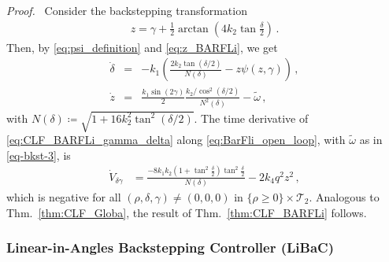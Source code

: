 \documentclass[journal,twoside,web]{ieeecolor}
\theoremstyle{definition}
\renewenvironment{proof}[1][Proof]{\par\pushQED{\qed}\normalfont\textit{#1.}~}{\popQED\par}
\begin{document}
\begin{proof}
Consider the backstepping transformation
\begin{align}\label{eq:z_BARFLi}
z =  \gamma + \frac{1}{2}\arctan\left(4k_2\tan\frac{\delta}{2}\right) 
\,.
\end{align} 
Then, by \eqref{eq:psi_definition} and \eqref{eq:z_BARFLi}, we get
\begin{subequations}
\label{eq:BarFli_open_loop}
\begin{eqnarray}
\dot{\delta} &=&  -k_1 \left( \frac{2k_2 \tan(\delta/2)}{N(\delta)} - z \psi(z,\gamma)\right)\,, \\
\dot{z} &=& \frac{k_1 \sin(2\gamma)}{2}\frac{k_2/\cos^2(\delta/2)}{N^2(\delta)} -\tilde{\omega} \,, \label{eq:zdot_BARFLi}
\end{eqnarray}
\end{subequations}
with $N(\delta) \coloneqq \sqrt{1 + 16 k_2^2 \tan^2(\delta/2)}$.
The time derivative of \eqref{eq:CLF_BARFLi_gamma_delta} along \eqref{eq:BarFli_open_loop}, with $\tilde{\omega}$ as in \eqref{eq-bkst-3}, is
\begin{align}\label{eq:V1_dot_cl_BARFLi}
\dot{V}_{\delta \gamma } &= \frac{-8k_1k_2(1 + \tan^2\frac{\delta}{2})\tan^2\frac{\delta}{2}}{N(\delta)} - 2k_4q^2z^2 
\,,
\end{align}
which is negative for all $(\rho,\delta,\gamma) \ne (0,0,0)$ in $\{\rho \ge 0\} \times \mathcal{T}_2$.
Analogous to Thm.~\ref{thm:CLF_Globa}, the result of Thm.~\ref{thm:CLF_BARFLi} follows.
\end{proof}

\subsubsection*{Linear-in-Angles Backstepping Controller (LiBaC)}
\end{document}
